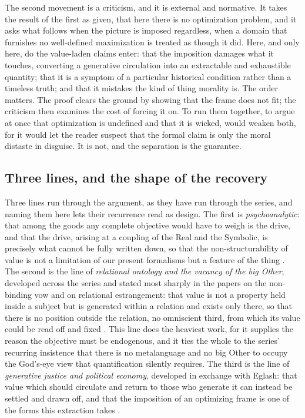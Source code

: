 The second movement is a criticism, and it is external and normative. It takes the result of the first as given, that here there is no optimization problem, and it asks what follows when the picture is imposed regardless, when a domain that furnishes no well-defined maximization is treated as though it did. Here, and only here, do the value-laden claims enter: that the imposition damages what it touches, converting a generative circulation into an extractable and exhaustible quantity; that it is a symptom of a particular historical condition rather than a timeless truth; and that it mistakes the kind of thing morality is. The order matters. The proof clears the ground by showing that the frame does not fit; the criticism then examines the cost of forcing it on. To run them together, to argue at once that optimization is undefined and that it is wicked, would weaken both, for it would let the reader suspect that the formal claim is only the moral distaste in disguise. It is not, and the separation is the guarantee.

\subsection*{Three lines, and the shape of the recovery}

Three lines run through the argument, as they have run through the series, and naming them here lets their recurrence read as design. The first is \emph{psychoanalytic}: that among the goods any complete objective would have to weigh is the drive, and that the drive, arising at a coupling of the Real and the Symbolic, is precisely what cannot be fully written down, so that the non-structurability of value is not a limitation of our present formalisms but a feature of the thing \parencite{lacan1977xi}. The second is the line of \emph{relational ontology and the vacancy of the big Other}, developed across the series and stated most sharply in the papers on the non-binding vow and on relational estrangement: that value is not a property held inside a subject but is generated within a relation and exists only there, so that there is no position outside the relation, no omniscient third, from which its value could be read off and fixed \parencite{paperxiii}. This line does the heaviest work, for it supplies the reason the objective must be endogenous, and it ties the whole to the series' recurring insistence that there is no metalanguage and no big Other to occupy the God's-eye view that quantification silently requires. The third is the line of \emph{generative justice and political economy}, developed in exchange with Eglash: that value which should circulate and return to those who generate it can instead be settled and drawn off, and that the imposition of an optimizing frame is one of the forms this extraction takes \parencite{eglash2016}.

